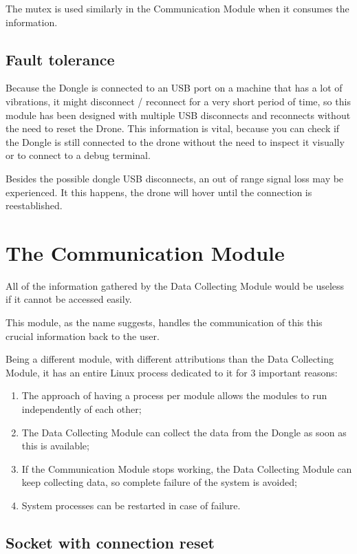 The mutex is used similarly in the Communication Module when it consumes the information.


\subsection{Fault tolerance}

Because the Dongle is connected to an USB port on a machine that has a lot of vibrations, it might disconnect / reconnect for a very short period of time, so this module has been designed  with multiple USB disconnects and reconnects without the need to reset the Drone. This information is vital, because you can check if the Dongle is still connected to the drone without the need to inspect it visually or to connect to a debug terminal.

Besides the possible dongle USB disconnects, an out of range signal loss may be experienced. It this happens, the drone will hover until the connection is reestablished.

\section{The Communication Module}

All of the information gathered by the Data Collecting Module would be useless if it cannot be accessed easily.

This module, as the name suggests, handles the communication of this this crucial information back to the user.

Being a different module, with different attributions than the Data Collecting Module, it has an entire Linux process dedicated to it for 3 important reasons:
\begin{enumerate}

\item The approach of having a process per module allows the modules to run independently of each other;
\item The Data Collecting Module can collect the data from the Dongle as soon as this is available;
\item If the Communication Module stops working, the Data Collecting Module can keep collecting data, so complete failure of the system is avoided;
\item System processes can be restarted in case of failure.

\end{enumerate}

\subsection{Socket with connection reset}

